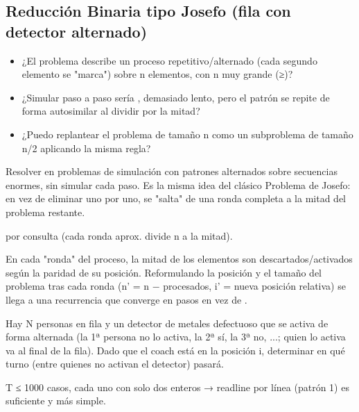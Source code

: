 \subsection{Reducción Binaria tipo Josefo (fila con detector alternado)}
\label{alg:7-1}


\begin{itemize}
\item ¿El problema describe un proceso repetitivo/alternado (cada segundo elemento se "marca") sobre n elementos, con n muy grande (≥)?
\item ¿Simular paso a paso sería , demasiado lento, pero el patrón se repite de forma autosimilar al dividir por la mitad?
\item ¿Puedo replantear el problema de tamaño n como un subproblema de tamaño \aprox{}n/2 aplicando la misma regla?
\end{itemize}

 Resolver en  problemas de simulación con patrones alternados sobre secuencias enormes, sin simular cada paso. Es la misma idea del clásico Problema de Josefo: en vez de eliminar uno por uno, se "salta" de una ronda completa a la mitad del problema restante.

  por consulta (cada ronda aprox. divide n a la mitad).

 En cada "ronda" del proceso, la mitad de los elementos son descartados/activados según la paridad de su posición. Reformulando la posición y el tamaño del problema tras cada ronda (n' = n − procesados, i' = nueva posición relativa) se llega a una recurrencia que converge en  pasos en vez de .


Hay N personas en fila y un detector de metales defectuoso que se activa de forma alternada (la 1ª persona no lo activa, la 2ª sí, la 3ª no, ...; quien lo activa va al final de la fila). Dado que el coach está en la posición i, determinar en qué turno (entre quienes no activan el detector) pasará.

 T ≤ 1000 casos, cada uno con solo dos enteros → readline por línea (patrón 1) es suficiente y más simple.


